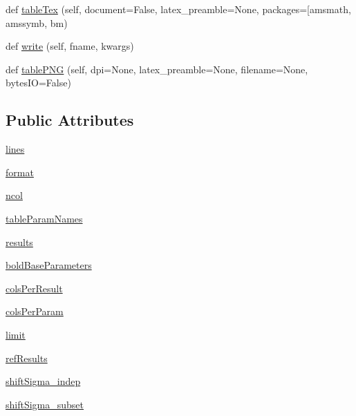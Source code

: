\begin{DoxyCompactItemize}
\item 
def \mbox{\hyperlink{classgetdist_1_1types_1_1ResultTable_a7afab33d231bed5c1ee97b2e9af37c3f}{table\+Tex}} (self, document=False, latex\+\_\+preamble=None, packages=\mbox{[}\textquotesingle{}amsmath\textquotesingle{}, amssymb, bm)
\item 
def \mbox{\hyperlink{classgetdist_1_1types_1_1ResultTable_a76ef92c87d609551019760f157829f2c}{write}} (self, fname, kwargs)
\item 
def \mbox{\hyperlink{classgetdist_1_1types_1_1ResultTable_a515896c352e07b23284d0fca028f4a04}{table\+P\+NG}} (self, dpi=None, latex\+\_\+preamble=None, filename=None, bytes\+IO=False)
\end{DoxyCompactItemize}
\subsection*{Public Attributes}
\begin{DoxyCompactItemize}
\item 
\mbox{\hyperlink{classgetdist_1_1types_1_1ResultTable_a0ee609726613350f31ccf00fbb7dca3a}{lines}}
\item 
\mbox{\hyperlink{classgetdist_1_1types_1_1ResultTable_a41051dd090be28eac24a41d625f34fe8}{format}}
\item 
\mbox{\hyperlink{classgetdist_1_1types_1_1ResultTable_a020be5a94df368053d01744a206bfaa0}{ncol}}
\item 
\mbox{\hyperlink{classgetdist_1_1types_1_1ResultTable_a5a3d001786c7f35d3cb3240ecbe0fed5}{table\+Param\+Names}}
\item 
\mbox{\hyperlink{classgetdist_1_1types_1_1ResultTable_a087b78232c8c79d2a61c647016998607}{results}}
\item 
\mbox{\hyperlink{classgetdist_1_1types_1_1ResultTable_a602bb3d574d9ab74b170d9dcad1662e6}{bold\+Base\+Parameters}}
\item 
\mbox{\hyperlink{classgetdist_1_1types_1_1ResultTable_ac8614ecb569cdc4986c0af267049dd63}{cols\+Per\+Result}}
\item 
\mbox{\hyperlink{classgetdist_1_1types_1_1ResultTable_aab50e121a747694694f4edb54e51a72a}{cols\+Per\+Param}}
\item 
\mbox{\hyperlink{classgetdist_1_1types_1_1ResultTable_ae3f612b398b5fe2ece1d5e7904c3ae9f}{limit}}
\item 
\mbox{\hyperlink{classgetdist_1_1types_1_1ResultTable_ac9bcce42fb0ec55746dae00b16b01064}{ref\+Results}}
\item 
\mbox{\hyperlink{classgetdist_1_1types_1_1ResultTable_aaa2d548e5a813f0373cbea1d48a1c6e3}{shift\+Sigma\+\_\+indep}}
\item 
\mbox{\hyperlink{classgetdist_1_1types_1_1ResultTable_a3061ea76fbf3054306c6c6c5f4972a1e}{shift\+Sigma\+\_\+subset}}
\end{DoxyCompactItemize}


